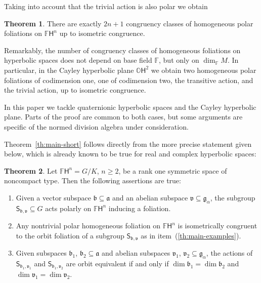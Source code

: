 \documentclass[12pt, a4paper]{amsart}
\newcommand{\g}{\mathfrak}
\newcommand{\s}{\mathsf}
\renewcommand{\O}{\mathbb{O}}
\newcommand{\F}{\mathbb{F}}
\theoremstyle{definition}
\newtheorem{maintheorem}{Theorem}
\begin{document}
Taking into account that the trivial action is also polar we obtain

\begin{maintheorem}
There are exactly $2n+1$ congruency classes of homogeneous polar foliations on $\F\s{H}^n$ up to isometric congruence.
\end{maintheorem}

Remarkably, the number of congruency classes of homogeneous foliations on hyperbolic
spaces does not depend on base field $\mathbb{F}$, but only on $\dim_\mathbb{F}M$.
In particular, in the Cayley hyperbolic plane $\O\s{H}^2$ we obtain two homogeneous polar foliations of codimension one,
one of codimension two, the transitive action, and the trivial action, up to isometric congruence.


In this paper we tackle quaternionic hyperbolic spaces and the Cayley hyperbolic plane.
Parts of the proof are common to both cases, but some arguments are specific of the normed division algebra under consideration.

Theorem~\ref{th:main-short} follows directly from the more precise statement given below,
which is already known to be true for real and complex hyperbolic spaces:

\begin{maintheorem}\label{th:main}
Let $\F\s{H}^n=G/K$, $n\geq 2$, be a rank one symmetric space of noncompact type.
Then the following assertions are true:
\begin{enumerate}[{\rm (1)}]
\item\label{th:main-examples} Given a vector subspace $\g{b}\subseteq \g{a}$ and an abelian subspace $\g{v}\subseteq \g{g}_\alpha$, the subgroup $\s{S}_{\g{b},\g{v}}\subseteq {G}$ acts polarly on $\F\s{H}^n$ inducing a foliation.

\item\label{th:main-classification} Any nontrivial polar homogeneous foliation on $\F\s{H}^n$ is isometrically congruent to the orbit foliation of a subgroup $\s{S}_{\g{b},\g{v}}$ as in item~(\ref{th:main-examples}).

\item\label{th:main-congruence} Given subspaces $\g{b}_1$, $\g{b}_2\subseteq \g{a}$ 
and abelian subspaces $\g{v}_1$, $\g{v}_2\subseteq \g{g}_{\alpha}$, 
the actions of $\s{S}_{\g{b}_1,\g{v}_1}$ and $\s{S}_{\g{b}_1,\g{v}_2}$ are orbit equivalent 
if and only if $\dim\g{b}_1=\dim\g{b}_2$ and $\dim \g{v}_1 = \dim \g{v}_2$.
\end{enumerate}
\end{maintheorem}
\end{document}
